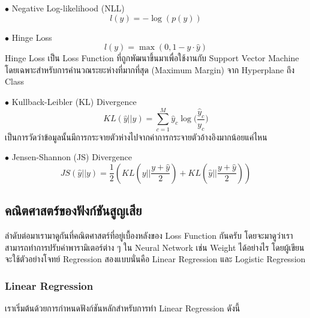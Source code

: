 \noindent $\bullet$ Negative Log-likelihood (NLL)
%
\begin{equation}\label{eq:neg_log_like}
    l(y) = -{\log(p(y))}
\end{equation}

\noindent $\bullet$ Hinge Loss
%
\begin{equation}\label{eq:hinge_loss}
    l(y) = \max(0, 1 - y \cdot \hat{y})
\end{equation}
%
\noindent Hinge Loss เป็น Loss Function ที่ถูกพัฒนาขึ้นมาเพื่อใช้งานกับ Support Vector Machine โดยเฉพาะสำหรับการคำนวณระยะห่างที่มากที่สุด (Maximum Margin) จาก Hyperplane ถึง Class

\noindent $\bullet$ Kullback-Leibler (KL) Divergence
%
\begin{equation}\label{eq:kl_diver}
    KL(\hat{y} || y) = \sum_{c=1}^{M}\hat{y}_c \log \bigg( {\frac{\hat{y}_c}{y_c}} \bigg)
\end{equation}
%
\noindent เป็นการวัดว่าข้อมูลนั้นมีการกระจายตัวห่างไปจากค่าการกระจายตัวอ้างอิงมากน้อยแค่ไหน

\noindent $\bullet$ Jensen-Shannon (JS) Divergence
%
\begin{equation}\label{eq:jensen_shannon_diver}
    JS(\hat{y} || y) = \frac{1}{2} \left ( KL \left ( y||\frac{y+\hat{y}}{2} \right ) +
    KL \left ( \hat{y}||\frac{y+\hat{y}}{2} \right ) \right )
\end{equation}

\subsection{คณิตศาสตร์ของฟังก์ชันสูญเสีย}

ลำดับต่อมาเรามาดูกันที่คณิตศาสตร์ที่อยู่เบื้องหลังของ Loss Function กันครับ โดยจะมาดูว่าเราสามารถทำการปรับค่าพารามิเตอร์ต่าง ๆ ใน Neural
Network เช่น Weight ได้อย่างไร โดยผู้เขียนจะใช้ตัวอย่างโจทย์ Regression สองแบบนั่นคือ Linear Regression และ Logistic Regression

\subsubsection{Linear Regression}

เราเริ่มต้นด้วยการกำหนดฟังก์ชันหลักสำหรับการทำ Linear Regression ดังนี้


